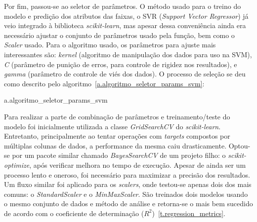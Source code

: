 Por fim, passou-se ao seletor de parâmetros. O método usado para o treino do modelo e predição dos atributos das faixas, o SVR (\textit{Support Vector Regressor}) já veio integrado à biblioteca \textit{scikit-learn}, mas apesar dessa conveniência ainda era necessário ajustar o conjunto de parâmetros usado pela função, bem como o \textit{Scaler} usado. Para o algoritmo usado, os parâmetros para ajuste mais interessantes são: \textit{kernel} (algoritmo de manipulação dos dados para uso na SVM), \textit{C} (parâmetro de punição de erros, para controle de rigidez nos resultados), e \textit{gamma} (parâmetro de controle de viés dos dados). O processo de seleção se deu como descrito pelo algoritmo~\ref{a.algoritmo_seletor_params_svm}:

\begin{nicealgo}{a.algoritmo_seletor_params_svm}
\naPREAMBLE
\naBODY
\naBEGIN{}
		\naEND{}
	\naEND{}
\naEND{}
\end{nicealgo}

Para realizar a parte de combinação de parâmetros e treinamento/teste do modelo foi inicialmente utilizada a classe \textit{GridSearchCV} do \textit{scikit-learn}. Entretanto, principalmente ao tentar operações com \textit{targets} compostos por múltiplas colunas de dados, a performance da mesma caiu drasticamente. Optou-se por um pacote similar chamado \textit{BayesSearchCV} de um projeto filho: o \textit{scikit-optimize}, após verificar melhora no tempo de execução. Apesar de ainda ser um processo lento e oneroso, foi necessário para maximizar a precisão dos resultados. Um fluxo similar foi aplicado para os \textit{scalers}, onde testou-se apenas dois dos mais comuns: o \textit{StandardScaler} e o \textit{MinMaxScaler}. São treinados dois modelos usando o mesmo conjunto de dados e método de análise e retorna-se o mais bem sucedido de acordo com o coeficiente de determinação ($R^2$)~\ref{t.regression_metrics}.

